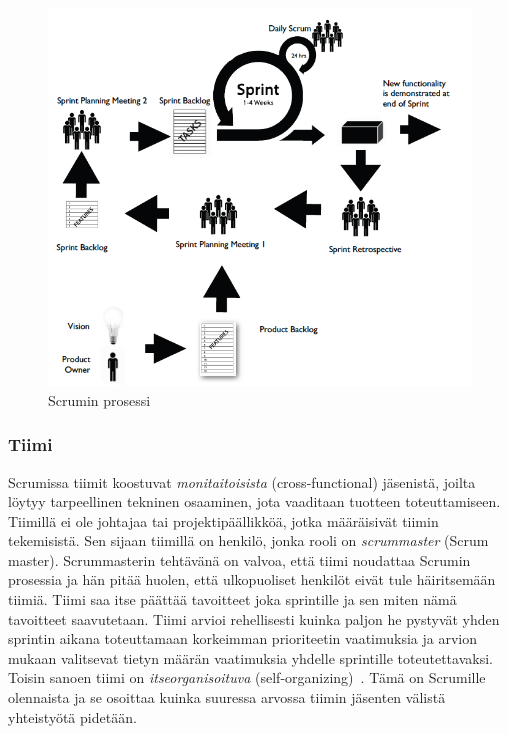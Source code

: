 \documentclass[finnish]{../tktltiki2}
\theoremstyle{definition}
\theoremstyle{remark}
\begin{document}
\begin{figure}[h]
     \includegraphics{scrum.png}
     \caption{Scrumin prosessi~\cite{ScrumHandBook}}\label{scrumprocess}
\end{figure}

\subsubsection{Tiimi}

Scrumissa tiimit koostuvat \emph{monitaitoisista} (cross-functional) 
jäsenistä, joilta löytyy tarpeellinen tekninen osaaminen, jota 
vaaditaan
tuotteen toteuttamiseen. Tiimillä ei ole johtajaa tai 
projektipäällikköä, jotka määräisivät tiimin tekemisistä. Sen sijaan tiimillä on henkilö, jonka rooli on \emph{scrummaster} (Scrum master). Scrummasterin tehtävänä on valvoa, että tiimi noudattaa Scrumin prosessia ja hän pitää huolen, että ulkopuoliset henkilöt eivät tule häiritsemään tiimiä.
Tiimi saa itse päättää tavoitteet joka sprintille ja sen miten nämä tavoitteet 
saavutetaan. Tiimi arvioi rehellisesti kuinka paljon he pystyvät yhden sprintin aikana toteuttamaan korkeimman prioriteetin vaatimuksia ja arvion mukaan valitsevat tietyn määrän vaatimuksia yhdelle sprintille toteutettavaksi. Toisin sanoen tiimi on \emph{itseorganisoituva}
(self-organizing)~\cite{ScrumHandBook}. Tämä on Scrumille olennaista ja se osoittaa 
kuinka suuressa arvossa tiimin jäsenten välistä yhteistyötä 
pidetään.
\end{document}
